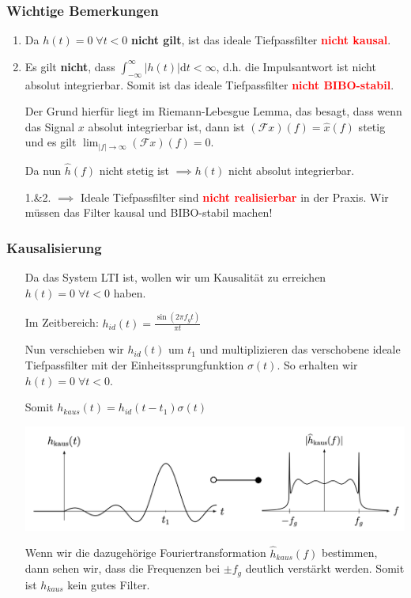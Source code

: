 \documentclass[11pt]{article}
\begin{document}
\subsubsection*{Wichtige Bemerkungen}
\begin{enumerate}
    \item Da $h(t) = 0 \; \forall t < 0$ \textbf{nicht gilt}, ist das ideale Tiefpassfilter \textcolor{red}{\textbf{nicht kausal}}.
    \item Es gilt \textbf{nicht}, dass $\displaystyle\int_{-\infty}^{\infty} |h(t)|\text{d}t < \infty$, d.h. die Impulsantwort ist nicht absolut integrierbar. Somit ist das ideale Tiefpassfilter \textcolor{red}{\textbf{nicht BIBO-stabil}}.
    \item[] Der Grund hierfür liegt im Riemann-Lebesgue Lemma, das besagt, dass wenn das Signal $x$ absolut integrierbar ist, dann ist $(\mathcal{F}x)(f) = \hat{x}(f)$ stetig und es gilt $\displaystyle\lim_{|f|\to \infty}(\mathcal{F}x)(f)=0$.
    \item[] Da nun $\hat{h}(f)$ nicht stetig ist $\implies h(t)$ nicht absolut integrierbar.
    \item[1.\&2.] $\implies$ Ideale Tiefpassfilter sind \textcolor{red}{\textbf{nicht realisierbar}} in der Praxis. Wir müssen das Filter kausal und BIBO-stabil machen!
\end{enumerate}

\pagebreak

\subsubsection*{Kausalisierung}
\vspace*{-0.5cm}
\begin{itemize}[leftmargin = 0pt]
    \item[] Da das System LTI ist, wollen wir um Kausalität zu erreichen $h(t) = 0 \; \forall t < 0$ haben.
    \item[] Im Zeitbereich: $h_{id}(t) = \displaystyle\frac{\sin(2 \pi f_g t)}{\pi t}$
    \item[] Nun verschieben wir $h_{id}(t)$ um $t_1$ und multiplizieren das verschobene ideale Tiefpassfilter mit der Einheitssprungfunktion $\sigma(t)$. So erhalten wir $h(t) = 0 \; \forall t < 0$.
    \item[] Somit $h_{kaus}(t) = h_{id}(t-t_1)\sigma(t)$
    \item[] \begin{center}
        \includegraphics[width=0.8\linewidth]{docimgs/h_kausal.jpg}
    \end{center}
    \item[] Wenn wir die dazugehörige Fouriertransformation $\hat{h}_{kaus}(f)$ bestimmen, dann sehen wir, dass die Frequenzen bei $\pm f_g$ deutlich verstärkt werden. Somit ist $h_{kaus}$ kein gutes Filter.
\end{itemize}
\end{document}
